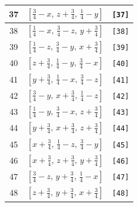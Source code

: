 \documentclass[fleqn,8pt]{jsarticle}
\begin{document}
\begin{longtable}{ccc}
37 & $\left[ \frac{3}{4} - x,\, z + \frac{3}{4},\, \frac{1}{4} - y \right]$ & {\tt [37]} \\ \hline
38 & $\left[ \frac{1}{4} - x,\, \frac{3}{4} - z,\, y + \frac{3}{4} \right]$ & {\tt [38]} \\ \hline
39 & $\left[ \frac{1}{4} - z,\, \frac{3}{4} - y,\, x + \frac{3}{4} \right]$ & {\tt [39]} \\ \hline
40 & $\left[ z + \frac{3}{4},\, \frac{1}{4} - y,\, \frac{3}{4} - x \right]$ & {\tt [40]} \\ \hline
41 & $\left[ y + \frac{3}{4},\, \frac{1}{4} - x,\, \frac{3}{4} - z \right]$ & {\tt [41]} \\ \hline
42 & $\left[ \frac{3}{4} - y,\, x + \frac{3}{4},\, \frac{1}{4} - z \right]$ & {\tt [42]} \\ \hline
43 & $\left[ \frac{1}{4} - y,\, \frac{3}{4} - x,\, z + \frac{3}{4} \right]$ & {\tt [43]} \\ \hline
44 & $\left[ y + \frac{3}{4},\, x + \frac{3}{4},\, z + \frac{3}{4} \right]$ & {\tt [44]} \\ \hline
45 & $\left[ x + \frac{3}{4},\, \frac{1}{4} - z,\, \frac{3}{4} - y \right]$ & {\tt [45]} \\ \hline
46 & $\left[ x + \frac{3}{4},\, z + \frac{3}{4},\, y + \frac{3}{4} \right]$ & {\tt [46]} \\ \hline
47 & $\left[ \frac{3}{4} - z,\, y + \frac{3}{4},\, \frac{1}{4} - x \right]$ & {\tt [47]} \\ \hline
48 & $\left[ z + \frac{3}{4},\, y + \frac{3}{4},\, x + \frac{3}{4} \right]$ & {\tt [48]} \\
\end{longtable}
\end{document}

